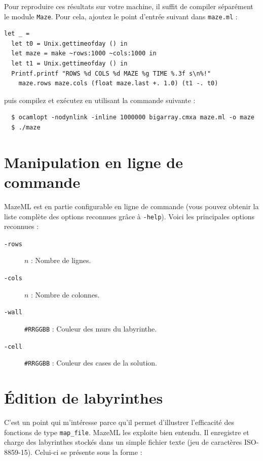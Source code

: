 \documentclass[11pt]{article}
\begin{document}
    Pour reproduire ces résultats sur votre machine, il suffit de compiler 
  séparément le module \texttt{Maze}. Pour cela, ajoutez le point d'entrée 
  suivant dans \texttt{maze.ml} :

\begin{verbatim}
let _ =
  let t0 = Unix.gettimeofday () in
  let maze = make ~rows:1000 ~cols:1000 in
  let t1 = Unix.gettimeofday () in
  Printf.printf "ROWS %d COLS %d MAZE %g TIME %.3f s\n%!"
    maze.rows maze.cols (float maze.last +. 1.0) (t1 -. t0)
\end{verbatim}

puis compilez et exécutez en utilisant la commande suivante :

\begin{verbatim}
  $ ocamlopt -nodynlink -inline 1000000 bigarray.cmxa maze.ml -o maze
  $ ./maze
\end{verbatim}


    \section{Manipulation en ligne de commande}

    MazeML est en partie configurable en ligne de commande (vous pouvez obtenir
  la liste complète des options reconnues grâce à \texttt{-help}). Voici les 
  principales options reconnues :

  \vspace{3mm}
  \begin{description}
    \item[\texttt{-rows}] $n$ : Nombre de lignes.
    \item[\texttt{-cols}] $n$ : Nombre de colonnes.
    \item[\texttt{-wall}] \texttt{#RRGGBB} : Couleur des murs du labyrinthe.
    \item[\texttt{-cell}] \texttt{#RRGGBB} : Couleur des cases de la solution.
  \end{description}


    \section{Édition de labyrinthes}

    C'est un point qui m'intéresse parce qu'il permet d'illustrer l'efficacité 
  des fonctions de type \texttt{map\_file}. MazeML les exploite 
  bien entendu. Il enregistre et charge des labyrinthes stockés dans un simple 
  fichier texte (jeu de caractères ISO-8859-15). Celui-ci se présente sous la 
  forme :
\end{document}
